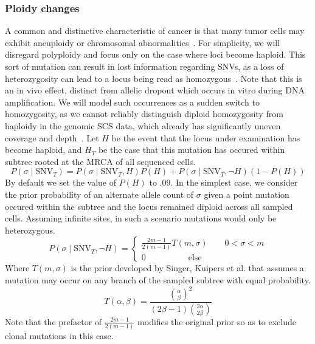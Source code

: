 \documentclass[../../main.tex]{subfiles}
\begin{document}
\subsubsection*{Ploidy changes}
A common and distinctive characteristic of cancer is that many tumor cells may exhibit aneuploidy or chromosomal abnormalities~\cite{gao2016punctuated, 21breasts, aneuploidy, merlo2006cancer, onecelltime}.
For simplicity, we will disregard polyploidy and focus only on the case where loci become haploid.
This sort of mutation can result in lost information regarding SNVs, as a loss of heterozygosity can lead to a locus being read as homozygous~\cite{sciphi}.
Note that this is an in vivo effect, distinct from allelic dropout which occurs in vitro during DNA amplification.
We will model such occurrences as a sudden switch to homozygosity, as we cannot reliably distinguish diploid homozygosity from haploidy in the genomic SCS data, which already has significantly uneven coverage and depth~\cite{monovar, scprimer}.
Let $H$ be the event that the locus under examination has become haploid, and $H_T$ be the case that this mutation has occured within subtree rooted at the MRCA of all sequenced cells.
\begin{equation}
P(\sigma \mid \text{SNV}_T) = P(\sigma\mid\text{SNV}_T,H)P(H) + P(\sigma\mid\text{SNV}_T,\neg H)(1-P(H)) 
\end{equation}
By default we set the value of $P(H)$ to .09. In the simplest case, we consider the prior probability of an alternate allele count of $\sigma$ given a point mutation occured within the subtree and the locus remained diploid across all sampled cells.
Assuming infinite sites, in such a scenario mutations would only be heterozygous.
\begin{equation*}
P(\sigma\mid\text{SNV}_T,\neg H) = \begin{cases} \frac{2m-1}{2(m-1)} T(m,\sigma) \qquad 0<\sigma< m\\ 0 \qquad \qquad \quad \text{else}\end{cases}
\end{equation*}
Where $T(m,\sigma)$ is the prior developed by Singer, Kuipers et al. that assumes a mutation may occur on any branch of the sampled subtree with equal probability.
\begin{equation}\label{eq:T}
T(\alpha,\beta)=\frac{\binom{\alpha}{\beta}^2}{(2\beta-1)\binom{2\alpha}{2\beta}}
\end{equation}
Note that the prefactor of $\frac{2m-1}{2(m-1)}$ modifies the original prior so as to exclude clonal mutations in this case.
\end{document}

